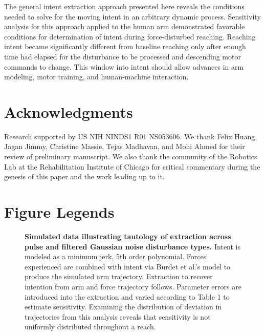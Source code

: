 The general intent extraction approach presented here reveals the conditions needed to solve for the moving intent in an arbitrary dynamic process. Sensitivity analysis for this approach applied to the human arm demonstrated favorable conditions for determination of intent during force-disturbed reaching. Reaching intent became significantly different from baseline reaching only after enough time had elapsed for the disturbance to be processed and descending motor commands to change. This window into intent should allow advances in arm modeling, motor training, and human-machine interaction.


\section*{Acknowledgments}
Research supported by US NIH NINDS1 R01 NS053606.  We thank Felix Huang, Jagan Jimmy, Christine Massie, Tejas Madhavan, and Mohi Ahmed for their review of preliminary manuscript. We also thank the community  of the Robotics Lab at the Rehabilitation Institute of Chicago for critical commentary during the genesis of this paper and the work leading up to it.


%
%
% 
\pagebreak
\section*{Figure Legends}
%
\begin{figure}
\caption{
{\bf Simulated data illustrating tautology of extraction across pulse and filtered Gaussian noise disturbance types.} Intent is modeled as a minimum jerk, 5th order polynomial. Forces experienced are combined with intent via Burdet et al.'s \cite{burdet2006stability} model to produce the simulated arm trajectory. Extraction to recover intention from arm and force trajectory follows. Parameter errors are introduced into the extraction and varied according to Table 1 to estimate sensitivity. Examining the distribution of deviation in trajectories from this analysis reveals that sensitivity is not uniformly distributed throughout a reach.
}
\label{fig:synthetic}
\end{figure}

